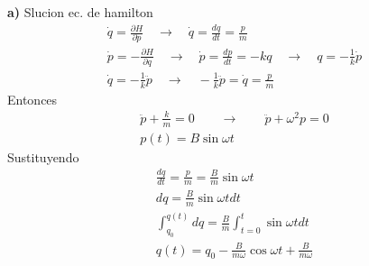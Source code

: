 \documentclass{article}
\newcommand{\caja}[3]{%
  \begin{tcolorbox}[colback=#1!5!white,colframe=#1!25!black,title=#2]
    #3
  \end{tcolorbox}%
}
\begin{document}
\hfill 

\hfill 

\textbf{a) } Slucion ec. de hamilton 
\begin{gather*}
  \dot q = \frac{\partial H  }{\partial p } \quad \rightarrow \quad \dot q = \frac{d q  }{d t } = \frac{p }{m } 
  \\
  \dot p = - \frac{\partial H  }{\partial  q } \quad \rightarrow \quad \dot p = \frac{d p  }{d t } = - k q \quad \rightarrow \quad q = -\frac{1 }{k } \dot p \\
  \dot q = - \frac{1}{k} \ddot p \quad \rightarrow \quad - \frac{1}{k } \ddot p = \dot q = \frac{p }{m }
\end{gather*}
Entonces 
\begin{gather*}
  \ddot p + \frac{k}{m} = 0  \qquad \rightarrow \qquad \ddot p + \omega^2 p = 0 
  \\
  p(t) = B \sin{\omega t } 
\end{gather*}
Sustituyendo 
\begin{gather*}
  \frac{d q  }{d t } = \frac{p}{m } = \frac{B }{m } \sin{\omega t }
  \\
  dq = \frac{B }{m } \sin{\omega t } dt 
  \\
  \displaystyle\int_{q_0 }^{q(t) } dq = \frac{B }{m } \displaystyle\int_{t = 0 }^{t } \sin{\omega t } dt \\
  q(t) = q_0 - \frac{B }{m\omega } \cos{\omega t } + \frac{B }{m \omega} 
\end{gather*}


\caja{blue}{Ejercicio 1 }{
  
}
\end{document}
